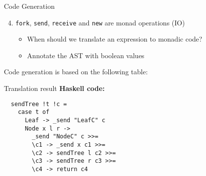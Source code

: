 \documentclass[unknownkeysallowed]{beamer}
\begin{document}
\lstset{language=CFST, style=eclipse}
\begin{frame}[fragile]{Code Generation}
  \begin{enumerate}
    \setcounter{enumi}{3}  
  \item \lstinline|fork|, \lstinline|send|, \lstinline|receive| and \lstinline|new| are monad operations (IO)
    \begin{itemize}
    \item When should we translate an expression to monadic code?
    \item Annotate the AST with boolean values
    \end{itemize}
  \end{enumerate}
  Code generation is based on the following table:
  \vskip 0.2cm
\end{frame}

\lstset{language=Haskell, style=eclipse}
\begin{frame}[fragile]{Translation result}
  \textbf{Haskell code:}
  \vskip 0.3cm
  \begin{lstlisting}
  sendTree !t !c =
    case t of 
      Leaf -> _send "LeafC" c 
      Node x l r ->
        _send "NodeC" c >>=
        \c1 -> _send x c1 >>=
        \c2 -> sendTree l c2 >>=
        \c3 -> sendTree r c3 >>=
        \c4 -> return c4 
      \end{lstlisting}
 \end{frame}
\end{document}
